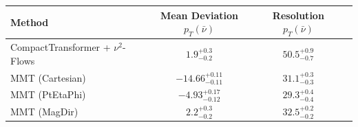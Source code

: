     \begin{tabular}{lccc}
        \toprule
        Method & Mean Deviation $p_{T}(\bar{\nu})$ & Resolution $p_{T}(\bar{\nu})$ \\
        \midrule
        CompactTransformer + $\nu^2$-Flows & $1.9^{+0.3}_{-0.2}$ & $50.5^{+0.9}_{-0.7}$ \\
        MMT (Cartesian) & $-14.66^{+0.11}_{-0.11}$ & $31.1^{+0.3}_{-0.3}$ \\
        MMT (PtEtaPhi) & $-4.93^{+0.17}_{-0.12}$ & $29.3^{+0.4}_{-0.4}$ \\
        MMT (MagDir) & $2.2^{+0.3}_{-0.2}$ & $32.5^{+0.2}_{-0.2}$ \\
        \bottomrule
    \end{tabular}